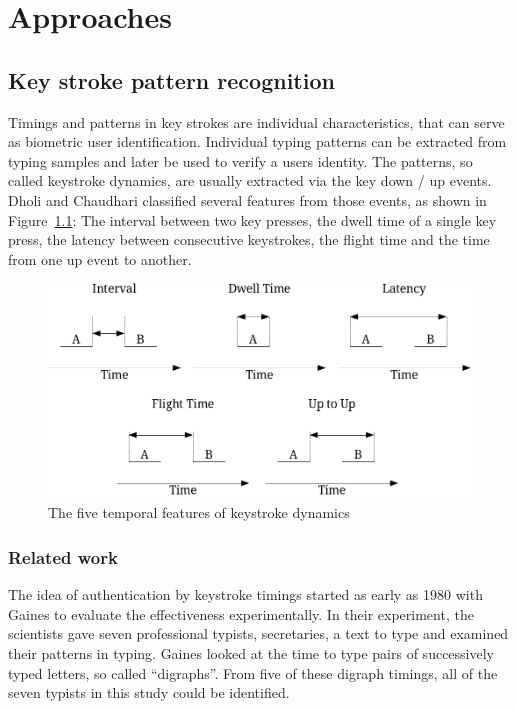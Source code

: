 \chapter{Approaches}\label{chapter:approaches}

\section{Key stroke pattern recognition}
Timings and patterns in key strokes are individual characteristics, that can serve as biometric user identification. Individual typing patterns can be extracted from typing samples and later be used to verify a users identity. The patterns, so called keystroke dynamics, are usually extracted via the key down / up events. Dholi and Chaudhari \cite{dholi2013typing} classified several features from those events, as shown in Figure~\ref{fig:keystrokeFeatures}: The interval between two key presses, the dwell time of a single key press, the latency between consecutive keystrokes, the flight time and the time from one up event to another.

\begin{figure}
    \centering
    \includegraphics[width=\linewidth]{figures/KeystrokeTemporalFeatures.png}
    \caption{The five temporal features of keystroke dynamics \cite{dholi2013typing}}
    \label{fig:keystrokeFeatures}
\end{figure}
\subsection{Related work}
The idea of authentication by keystroke timings started as early as 1980 with Gaines \etal\cite{gaines1980authentication} to evaluate the effectiveness experimentally. In their experiment, the scientists gave seven professional typists, \ie secretaries, a text to type and examined their patterns in typing. Gaines \etal looked at the time to type pairs of successively typed letters, so called ``digraphs''. From five of these digraph timings, all of the seven typists in this study could be identified.

